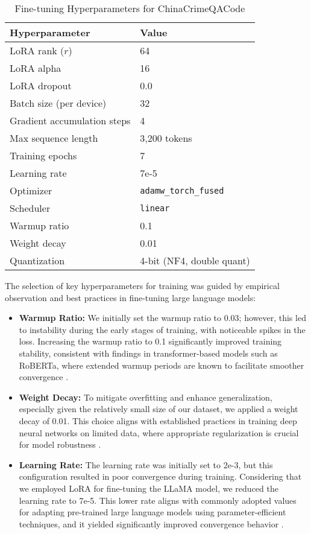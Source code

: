 \begin{table}[H]
\centering
\caption{Fine-tuning Hyperparameters for ChinaCrimeQACode}
\label{tab:hyperparameters}
\begin{tabular}{ll}
\toprule
\textbf{Hyperparameter} & \textbf{Value} \\
\midrule
LoRA rank ($r$) & 64 \\
LoRA alpha & 16 \\
LoRA dropout & 0.0 \\
Batch size (per device) & 32 \\
Gradient accumulation steps & 4 \\
Max sequence length & 3,200 tokens \\
Training epochs & 7 \\
Learning rate & 7e-5 \\
Optimizer & \texttt{adamw\_torch\_fused} \\
Scheduler & \texttt{linear} \\
Warmup ratio & 0.1 \\
Weight decay & 0.01 \\
Quantization & 4-bit (NF4, double quant) \\
\bottomrule
\end{tabular}
\end{table}

The selection of key hyperparameters for training was guided by empirical observation and best practices in fine-tuning large language models:
\begin{itemize}
    
\item \textbf{Warmup Ratio:} We initially set the warmup ratio to 0.03; however, this led to instability during the early stages of training, with noticeable spikes in the loss. Increasing the warmup ratio to 0.1 significantly improved training stability, consistent with findings in transformer-based models such as RoBERTa, where extended warmup periods are known to facilitate smoother convergence \cite{liu2019robertarobustlyoptimizedbert}.

\item \textbf{Weight Decay:} To mitigate overfitting and enhance generalization, especially given the relatively small size of our dataset, we applied a weight decay of 0.01. This choice aligns with established practices in training deep neural networks on limited data, where appropriate regularization is crucial for model robustness \cite{brainacgan}.

\item \textbf{Learning Rate:} The learning rate was initially set to 2e-3, but this configuration resulted in poor convergence during training. Considering that we employed LoRA for fine-tuning the LLaMA model, we reduced the learning rate to 7e-5. This lower rate aligns with commonly adopted values for adapting pre-trained large language models using parameter-efficient techniques, and it yielded significantly improved convergence behavior \cite{zhou2024automixqselfadjustingquantizationhigh}.

\end{itemize}
